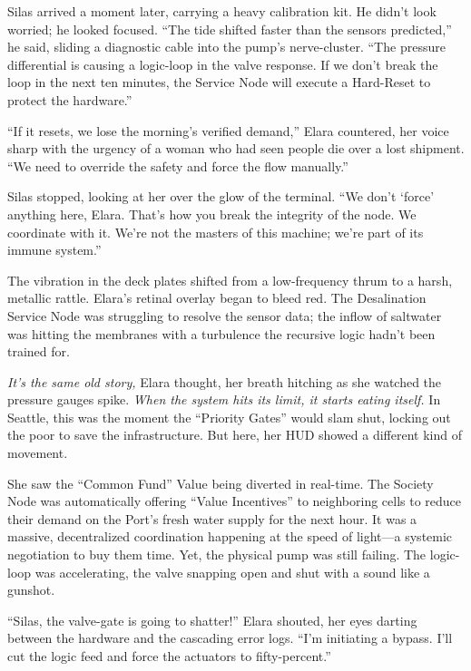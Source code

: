Silas arrived a moment later, carrying a heavy calibration kit. He didn't look worried; he looked focused. ``The tide shifted faster than the sensors predicted,'' he said, sliding a diagnostic cable into the pump's nerve-cluster. ``The pressure differential is causing a logic-loop in the valve response. If we don't break the loop in the next ten minutes, the Service Node will execute a Hard-Reset to protect the hardware.''

``If it resets, we lose the morning's verified demand,'' Elara countered, her voice sharp with the urgency of a woman who had seen people die over a lost shipment. ``We need to override the safety and force the flow manually.''

Silas stopped, looking at her over the glow of the terminal. ``We don't `force' anything here, Elara. That's how you break the integrity of the node. We coordinate with it. We're not the masters of this machine; we're part of its immune system.''


The vibration in the deck plates shifted from a low-frequency thrum to a harsh, metallic rattle. Elara's retinal overlay began to bleed red. The Desalination Service Node was struggling to resolve the sensor data; the inflow of saltwater was hitting the membranes with a turbulence the recursive logic hadn't been trained for. 

\textit{It's the same old story,} Elara thought, her breath hitching as she watched the pressure gauges spike. \textit{When the system hits its limit, it starts eating itself.} In Seattle, this was the moment the ``Priority Gates'' would slam shut, locking out the poor to save the infrastructure. But here, her HUD showed a different kind of movement. 

She saw the ``Common Fund'' Value being diverted in real-time. The Society Node was automatically offering ``Value Incentives'' to neighboring cells to reduce their demand on the Port's fresh water supply for the next hour. It was a massive, decentralized coordination happening at the speed of light—a systemic negotiation to buy them time. Yet, the physical pump was still failing. The logic-loop was accelerating, the valve snapping open and shut with a sound like a gunshot.

``Silas, the valve-gate is going to shatter!'' Elara shouted, her eyes darting between the hardware and the cascading error logs. ``I'm initiating a bypass. I'll cut the logic feed and force the actuators to fifty-percent.''

